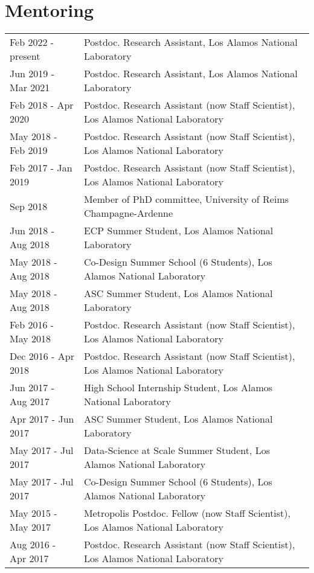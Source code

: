 \documentclass{article}
\begin{document}
\vspace{-2mm}
\section*{Mentoring}
\vspace{-4mm}

\begin{longtable}{p{}p{}}
Feb 2022 - present & Postdoc. Research Assistant, Los Alamos National Laboratory \\
Jun 2019 - Mar 2021 & Postdoc. Research Assistant, Los Alamos National Laboratory \\
Feb 2018 - Apr 2020 & Postdoc. Research Assistant (now Staff Scientist), Los Alamos National Laboratory \\
May 2018 - Feb 2019 & Postdoc. Research Assistant (now Staff Scientist), Los Alamos National Laboratory \\
Feb 2017 - Jan 2019 & Postdoc. Research Assistant (now Staff Scientist), Los Alamos National Laboratory \\
Sep 2018 & Member of PhD committee, University of Reims Champagne-Ardenne \\
Jun 2018 - Aug 2018 & ECP Summer Student, Los Alamos National Laboratory \\
May 2018 - Aug 2018 & Co-Design Summer School (6 Students), Los Alamos National Laboratory \\
May 2018 - Aug 2018 & ASC Summer Student, Los Alamos National Laboratory \\
Feb 2016 - May 2018 & Postdoc. Research Assistant (now Staff Scientist), Los Alamos National Laboratory \\
Dec 2016 - Apr 2018 & Postdoc. Research Assistant (now Staff Scientist), Los Alamos National Laboratory \\
Jun 2017 - Aug 2017 & High School Internship Student, Los Alamos National Laboratory \\
Apr 2017 - Jun 2017 & ASC Summer Student, Los Alamos National Laboratory \\
May 2017 - Jul 2017 & Data-Science at Scale Summer Student, Los Alamos National Laboratory \\
May 2017 - Jul 2017 & Co-Design Summer School (6 Students), Los Alamos National Laboratory \\
May 2015 - May 2017 & Metropolis Postdoc. Fellow (now Staff Scientist), Los Alamos National Laboratory \\
Aug 2016 - Apr 2017 & Postdoc. Research Assistant (now Staff Scientist), Los Alamos National Laboratory \\

\end{longtable}
\end{document}
